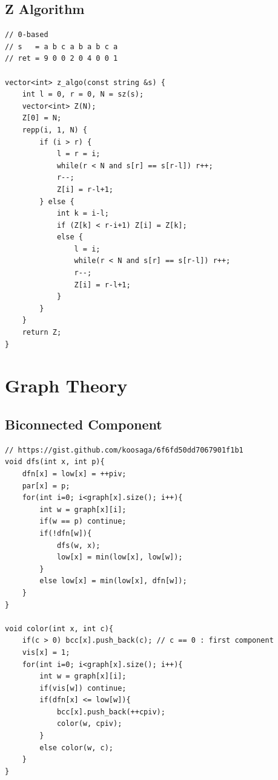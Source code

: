 \documentclass[landscape, 8pt, a4paper, oneside, twocolumn]{extarticle}
\begin{document}
\subsection{Z Algorithm}
\begin{verbatim}
// 0-based
// s   = a b c a b a b c a
// ret = 9 0 0 2 0 4 0 0 1 

vector<int> z_algo(const string &s) {
    int l = 0, r = 0, N = sz(s);
    vector<int> Z(N);
    Z[0] = N;
    repp(i, 1, N) {
        if (i > r) {
            l = r = i;
            while(r < N and s[r] == s[r-l]) r++;
            r--;
            Z[i] = r-l+1;
        } else {
            int k = i-l;
            if (Z[k] < r-i+1) Z[i] = Z[k];
            else {
                l = i;
                while(r < N and s[r] == s[r-l]) r++;
                r--;
                Z[i] = r-l+1;
            }
        }
    }
    return Z;
}
\end{verbatim}

\section{Graph Theory}
\subsection{Biconnected Component}
\begin{verbatim}
// https://gist.github.com/koosaga/6f6fd50dd7067901f1b1
void dfs(int x, int p){
    dfn[x] = low[x] = ++piv;
    par[x] = p;
    for(int i=0; i<graph[x].size(); i++){
        int w = graph[x][i];
        if(w == p) continue;
        if(!dfn[w]){
            dfs(w, x);
            low[x] = min(low[x], low[w]);
        }
        else low[x] = min(low[x], dfn[w]);
    }
}

void color(int x, int c){
    if(c > 0) bcc[x].push_back(c); // c == 0 : first component
    vis[x] = 1;
    for(int i=0; i<graph[x].size(); i++){
        int w = graph[x][i];
        if(vis[w]) continue;
        if(dfn[x] <= low[w]){
            bcc[x].push_back(++cpiv);
            color(w, cpiv);
        }
        else color(w, c);
    }
}
\end{verbatim}
\end{document}
